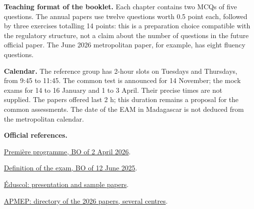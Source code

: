 \textbf{Teaching format of the booklet.} Each chapter contains two MCQs of five questions. The annual papers use twelve questions worth 0.5 point each, followed by three exercises totalling 14 points: this is a preparation choice compatible with the regulatory structure, not a claim about the number of questions in the future official paper. The June 2026 metropolitan paper, for example, has eight fluency questions.

\textbf{Calendar.} The reference group has 2-hour slots on Tuesdays and Thursdays, from 9:45 to 11:45. The common test is announced for 14 November; the mock exams for 14 to 16 January and 1 to 3 April. Their precise times are not supplied. The papers offered last 2 h; this duration remains a proposal for the common assessments. The date of the EAM in Madagascar is not deduced from the metropolitan calendar.

\textbf{Official references.}\par
\href{https://www.education.gouv.fr/bo/2026/Hebdo14/MENE2602917A}{Première programme, BO of 2 April 2026}.\par
\href{https://www.education.gouv.fr/bo/2025/Hebdo24/MENE2515469N}{Definition of the exam, BO of 12 June 2025}.\par
\href{https://eduscol.education.gouv.fr/5688/epreuve-anticipee-de-mathematiques-aux-baccalaureats-general-et-technologique}{Éduscol: presentation and sample papers}.\par
\href{https://www.apmep.fr/Epreuve-anticipee-2026}{APMEP: directory of the 2026 papers, several centres}.
\tableofcontents
\mxnewpage
